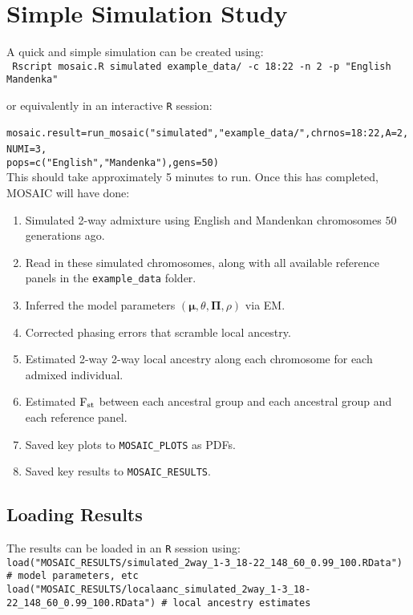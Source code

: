 \documentclass{article}
\begin{document}
\section{Simple Simulation Study}



A quick and simple simulation can be created using:\\
\verb+ Rscript mosaic.R simulated example_data/ -c 18:22 -n 2 -p "English Mandenka"+

or equivalently in an interactive \texttt{R} session:\\
\verb+ mosaic.result=run_mosaic("simulated","example_data/",chrnos=18:22,A=2,NUMI=3,+
\verb+                                pops=c("English","Mandenka"),gens=50) +\\
This should take approximately 5 minutes to run. 
Once this has completed, MOSAIC will have done:
\begin{enumerate}
  \item Simulated 2-way admixture using English and Mandenkan chromosomes $50$ generations ago.
  \item Read in these simulated chromosomes, along with all available reference panels in the \texttt{example\_data} folder.
  \item Inferred the model parameters $(\bm\mu, \theta, \bm\Pi, \rho)$ via EM.
  \item Corrected phasing errors that scramble local ancestry. 
  \item Estimated 2-way 2-way local ancestry along each chromosome for each admixed individual. 
  \item Estimated $\textrm{F}_{\textrm{st}}$ between each ancestral group and each ancestral group and each reference panel. 
  \item Saved key plots to \texttt{MOSAIC\_PLOTS} as PDFs.
  \item Saved key results to \texttt{MOSAIC\_RESULTS}.
\end{enumerate}

\subsection{Loading Results}
The results can be loaded in an \texttt{R} session using:\\
\verb+load("MOSAIC_RESULTS/simulated_2way_1-3_18-22_148_60_0.99_100.RData") # model parameters, etc+  \\
\verb+load("MOSAIC_RESULTS/localaanc_simulated_2way_1-3_18-22_148_60_0.99_100.RData") # local ancestry estimates+ 
\end{document}
